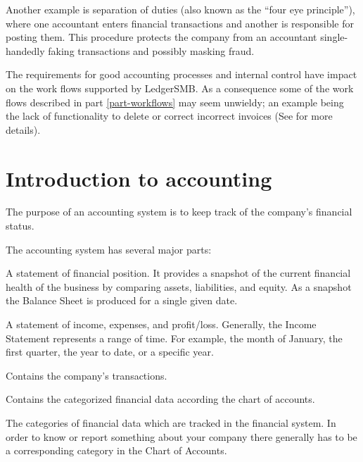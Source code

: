 Another example is separation of duties (also known as the ``four eye principle''),
where one accountant enters financial transactions and another is responsible for
posting them. This procedure protects the company from an accountant single-handedly
faking transactions and possibly masking fraud.

The requirements for good accounting processes and internal control have impact
on the work flows supported by LedgerSMB. As a consequence some of the work flows
described in part \ref{part-workflows} may seem unwieldy; an example being the
lack of functionality to delete or correct incorrect invoices (See  for more details).



\chapter{Introduction to accounting}
\label{cha-accounting-introduction}

The purpose of an accounting system is to keep track of the company's financial status.

The accounting system has several major parts:
\begin{description}[style=nextline]
        \item [Balance Sheet] A statement of financial position. It provides a snapshot of
        the current financial health of the business by comparing assets, liabilities,
        and equity.  As a snapshot the Balance Sheet is produced for a single given date.
        \item [Income Statement] A statement of income, expenses, and profit/loss.
        Generally, the Income Statement represents a range of time. For example,
        the month of January, the first quarter, the year to date, or a specific year.
        \item [General Journal] Contains the company's transactions.
        \item [General Ledger] Contains the categorized financial data according the chart
        of accounts.
        \item [Chart of Accounts] The categories of financial data which are tracked in
        the financial system. In order to know or report something about your company there
        generally has to be a corresponding category in the Chart of Accounts.
\end{description}


